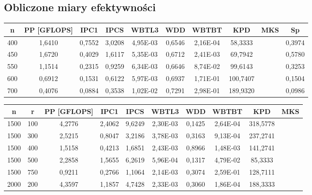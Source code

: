 \documentclass[10pt,a4paper]{article}
\begin{document}
\subsection{Obliczone miary efektywności}
\begin{center}
	\begin{tabular}{ |c|c|c|c|c|c|c|c|c|c| }
		\hline
		n   & PP [GFLOPS] & IPC1   & IPCS   & WBTL3    & WDD    & WBTBT    & KPD      & MKS & Sp     \\
		\hline
		400 & 1,6410      & 0,7552 & 3,0208 & 4,95E-03 & 0,6546 & 2,16E-04 & 58,3333  &     & 0,3974 \\
		\hline
		450 & 1,6720      & 0,4029 & 1,6117 & 5,35E-03 & 0,6712 & 2,41E-03 & 69,7942  &     & 0,5780 \\
		\hline
		550 & 1,1514      & 0,2315 & 0,9259 & 6,34E-03 & 0,6646 & 8,74E-02 & 99,6143  &     & 0,3253 \\
		\hline
		600 & 0,6912      & 0,1531 & 0,6122 & 5,97E-03 & 0,6937 & 1,71E-01 & 100,7407 &     & 0,1504 \\
		\hline
		700 & 0,4076      & 0,0884 & 0,3538 & 1,02E-02 & 0,7291 & 2,98E-01 & 189,9320 &     & 0,0986 \\
		\hline
	\end{tabular}
\end{center}

\begin{center}
	\begin{tabular}{ |c|c|c|c|c|c|c|c|c|c| }
		\hline
		n    & r   & PP [GFLOPS] & IPC1   & IPCS   & WBTL3    & WDD    & WBTBT    & KPD      & MKS \\
		\hline
		1500 & 100 & 4,2776      & 2,4062 & 9,6249 & 2,30E-03 & 0,1425 & 2,64E-04 & 318,5778 &     \\
		\hline
		1500 & 300 & 2,5215      & 0,8047 & 3,2186 & 3,78E-03 & 0,3163 & 9,13E-04 & 237,2741 &     \\
		\hline
		1500 & 400 & 1,5158      & 0,4213 & 1,6851 & 2,43E-03 & 0,8966 & 1,48E-03 & 141,2741 &     \\
		\hline
		1500 & 500 & 2,2858      & 1,5655 & 6,2619 & 5,96E-04 & 0,1317 & 4,79E-02 & 85,3333  &     \\
		\hline
		1500 & 750 & 0,9211      & 0,2766 & 1,1064 & 2,14E-03 & 0,3074 & 2,59E-01 & 128,7111 &     \\
		\hline
		2000 & 200 & 4,3597      & 1,1857 & 4,7428 & 2,33E-03 & 0,3060 & 1,86E-04 & 188,3333 &     \\
		\hline
	\end{tabular}
\end{center}
\end{document}
